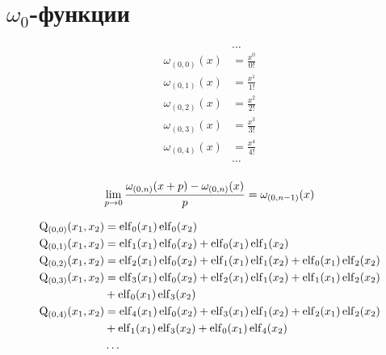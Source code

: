 
\section{$\omega_0$-функции}

\begin{equation*}\begin{aligned}
&\ldots \\
\omega_{(0,0)}(x) &= \frac{x^0}{0!} \\
\omega_{(0,1)}(x) &= \frac{x^1}{1!} \\
\omega_{(0,2)}(x) &= \frac{x^2}{2!} \\
\omega_{(0,3)}(x) &= \frac{x^3}{3!} \\
\omega_{(0,4)}(x) &= \frac{x^4}{4!} \\
&\ldots \\
\end{aligned}\end{equation*}

\begin{equation*}
\lim_{p \to 0} \frac{\omega_{(0, n)}(x + p) - \omega_{(0, n)}(x)}{p} = \omega_{(0, n - 1)}(x) \\
\end{equation*}

\begin{equation*} \begin{aligned}
\mathrm{Q}_{(0,0)}(x_1, x_2) &=  
  \elf_0(x_1) \elf_0(x_2) \\
%
\mathrm{Q}_{(0,1)}(x_1, x_2) &=  
  \elf_1(x_1) \elf_0(x_2)
+ \elf_0(x_1) \elf_1(x_2) \\
%
\mathrm{Q}_{(0,2)}(x_1, x_2) &=  
  \elf_2(x_1) \elf_0(x_2)
+ \elf_1(x_1) \elf_1(x_2)
+ \elf_0(x_1) \elf_2(x_2) \\
%
\mathrm{Q}_{(0,3)}(x_1, x_2) &=  
  \elf_3(x_1) \elf_0(x_2)
+ \elf_2(x_1) \elf_1(x_2)
+ \elf_1(x_1) \elf_2(x_2) \\ &
+ \elf_0(x_1) \elf_3(x_2) \\
%
\mathrm{Q}_{(0,4)}(x_1, x_2) &=  
  \elf_4(x_1) \elf_0(x_2)
+ \elf_3(x_1) \elf_1(x_2)
+ \elf_2(x_1) \elf_2(x_2) \\ &
+ \elf_1(x_1) \elf_3(x_2)
+ \elf_0(x_1) \elf_4(x_2) \\
%
&\ldots \\
\end{aligned} \end{equation*}

